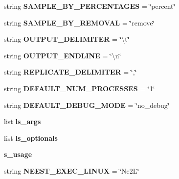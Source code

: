 \begin{DoxyCompactItemize}
\item 
string {\bfseries S\+A\+M\+P\+L\+E\+\_\+\+B\+Y\+\_\+\+P\+E\+R\+C\+E\+N\+T\+A\+G\+ES} = \char`\"{}percent\char`\"{}\hypertarget{namespacenegui_1_1pgdriveneestimator_a6ee69b369b673a4e1a4bd9538dd98416}{}\label{namespacenegui_1_1pgdriveneestimator_a6ee69b369b673a4e1a4bd9538dd98416}

\item 
string {\bfseries S\+A\+M\+P\+L\+E\+\_\+\+B\+Y\+\_\+\+R\+E\+M\+O\+V\+AL} = \char`\"{}remove\char`\"{}\hypertarget{namespacenegui_1_1pgdriveneestimator_a9ec6d87d70349dd43f33a16cfa7e68c0}{}\label{namespacenegui_1_1pgdriveneestimator_a9ec6d87d70349dd43f33a16cfa7e68c0}

\item 
string {\bfseries O\+U\+T\+P\+U\+T\+\_\+\+D\+E\+L\+I\+M\+I\+T\+ER} = \char`\"{}\textbackslash{}t\char`\"{}\hypertarget{namespacenegui_1_1pgdriveneestimator_a68b08075d6e1a58ae325c600881c9d6c}{}\label{namespacenegui_1_1pgdriveneestimator_a68b08075d6e1a58ae325c600881c9d6c}

\item 
string {\bfseries O\+U\+T\+P\+U\+T\+\_\+\+E\+N\+D\+L\+I\+NE} = \char`\"{}\textbackslash{}n\char`\"{}\hypertarget{namespacenegui_1_1pgdriveneestimator_a56a1a1d753221dfbed6ffc7cd58222f1}{}\label{namespacenegui_1_1pgdriveneestimator_a56a1a1d753221dfbed6ffc7cd58222f1}

\item 
string {\bfseries R\+E\+P\+L\+I\+C\+A\+T\+E\+\_\+\+D\+E\+L\+I\+M\+I\+T\+ER} = \char`\"{},\char`\"{}\hypertarget{namespacenegui_1_1pgdriveneestimator_a4a72408d1cee500503a7aa185253b438}{}\label{namespacenegui_1_1pgdriveneestimator_a4a72408d1cee500503a7aa185253b438}

\item 
string {\bfseries D\+E\+F\+A\+U\+L\+T\+\_\+\+N\+U\+M\+\_\+\+P\+R\+O\+C\+E\+S\+S\+ES} = \char`\"{}1\char`\"{}\hypertarget{namespacenegui_1_1pgdriveneestimator_a2e948c0ce60271c8e6e3b08edb453839}{}\label{namespacenegui_1_1pgdriveneestimator_a2e948c0ce60271c8e6e3b08edb453839}

\item 
string {\bfseries D\+E\+F\+A\+U\+L\+T\+\_\+\+D\+E\+B\+U\+G\+\_\+\+M\+O\+DE} = \char`\"{}no\+\_\+debug\char`\"{}\hypertarget{namespacenegui_1_1pgdriveneestimator_af83e46ff34683de5b4e27783ac68425f}{}\label{namespacenegui_1_1pgdriveneestimator_af83e46ff34683de5b4e27783ac68425f}

\item 
list {\bfseries ls\+\_\+args}
\item 
list {\bfseries ls\+\_\+optionals}
\item 
{\bfseries s\+\_\+usage}
\item 
string {\bfseries N\+E\+E\+S\+T\+\_\+\+E\+X\+E\+C\+\_\+\+L\+I\+N\+UX} = \char`\"{}Ne2L\char`\"{}\hypertarget{namespacenegui_1_1pgdriveneestimator_ac3fffa665da853c78053b5bec04422e1}{}\label{namespacenegui_1_1pgdriveneestimator_ac3fffa665da853c78053b5bec04422e1}


\end{DoxyCompactItemize}
